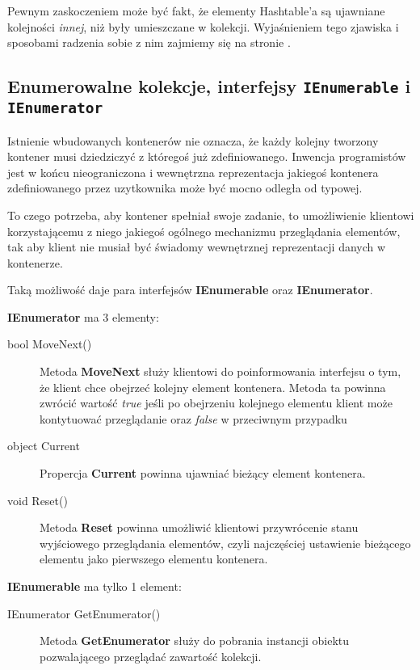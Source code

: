 Pewnym zaskoczeniem może być fakt, że elementy Hashtable'a są ujawniane kolejności {\em innej}, niż 
były umieszczane w kolekcji. Wyjaśnieniem tego zjawiska i sposobami 
radzenia sobie z nim zajmiemy się na stronie \pageref{sect:skladanie_enum}.

\subsection{Enumerowalne kolekcje, interfejsy {\tt IEnumerable} i {\tt IEnumerator}}
\label{IEnumerable}

Istnienie wbudowanych kontenerów nie oznacza, że każdy kolejny tworzony kontener musi dziedziczyć
z któregoś już zdefiniowanego. Inwencja programistów jest w końcu nieograniczona i wewnętrzna
reprezentacja jakiegoś kontenera zdefiniowanego przez uzytkownika może być mocno odległa od
typowej. 

To czego potrzeba, aby kontener spełniał swoje zadanie, to umożliwienie klientowi korzystającemu z niego
jakiegoś ogólnego mechanizmu przeglądania elementów, tak aby klient nie musiał być świadomy
wewnętrznej reprezentacji danych w kontenerze.

Taką możliwość daje para interfejsów {\bf IEnumerable} oraz {\bf IEnumerator}.

{\bf IEnumerator} ma 3 elementy:

\begin{description}
\item [bool MoveNext()] 
Metoda {\bf MoveNext} służy klientowi do poinformowania interfejsu o tym, że klient chce
obejrzeć kolejny element kontenera. Metoda ta powinna zwrócić wartość {\em true} jeśli po obejrzeniu
kolejnego elementu klient może kontytuować przeglądanie oraz {\em false} w przeciwnym przypadku

\item [object Current]
Propercja {\bf Current} powinna ujawniać bieżący element kontenera. 

\item [void Reset()]
Metoda {\bf Reset} powinna umożliwić klientowi przywrócenie stanu wyjściowego przeglądania elementów,
czyli najczęściej ustawienie bieżącego elementu jako pierwszego elementu kontenera.
\end{description}

{\bf IEnumerable} ma tylko 1 element:

\begin{description}
\item [IEnumerator GetEnumerator()] 
Metoda {\bf GetEnumerator} służy do pobrania instancji obiektu pozwalającego przeglądać zawartość
kolekcji. 
\end{description}

